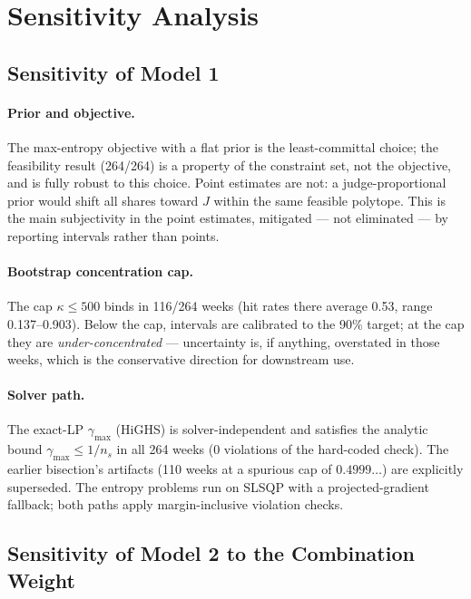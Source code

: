 \documentclass[11pt]{article}
\begin{document}
\section{Sensitivity Analysis}
\label{sec:sensitivity}

\subsection{Sensitivity of Model 1}

\paragraph{Prior and objective.} The max-entropy objective with a flat prior is the
least-committal choice; the feasibility result (264/264) is a property of the
constraint set, not the objective, and is fully robust to this choice. Point estimates
are not: a judge-proportional prior would shift all shares toward $J$ within the same
feasible polytope. This is the main subjectivity in the point estimates, mitigated ---
not eliminated --- by reporting intervals rather than points.

\paragraph{Bootstrap concentration cap.} The cap $\kappa \le 500$ binds in 116/264
weeks (hit rates there average 0.53, range 0.137--0.903). Below the cap, intervals are
calibrated to the 90\% target; at the cap they are \emph{under-concentrated} ---
uncertainty is, if anything, overstated in those weeks, which is the conservative
direction for downstream use.

\paragraph{Solver path.} The exact-LP $\gamma_{\max}$ (HiGHS) is solver-independent and
satisfies the analytic bound $\gamma_{\max} \le 1/n_s$ in all 264 weeks (0 violations of
the hard-coded check). The earlier bisection's artifacts (110 weeks at a spurious cap
of $0.4999\dots$) are explicitly superseded. The entropy problems run on SLSQP with a
projected-gradient fallback; both paths apply margin-inclusive violation checks.

\subsection{Sensitivity of Model 2 to the Combination Weight}
\end{document}
